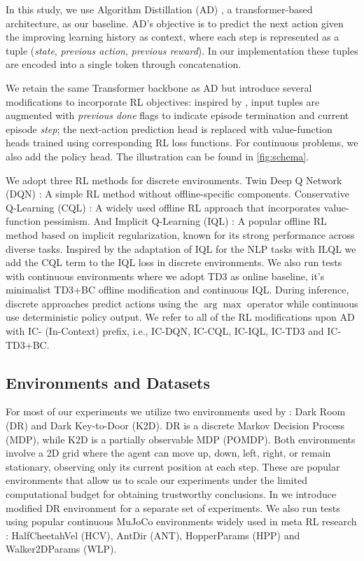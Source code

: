 \documentclass{article} %
\begin{document}
In this study, we use Algorithm Distillation (AD) \citep{laskin2022context}, a transformer-based \citep{vaswani2017attention} architecture, as our baseline. AD’s objective is to predict the next action given the improving learning history as context, where each step is represented as a tuple (\textit{state}, \textit{previous action}, \textit{previous reward}). In our implementation these tuples are encoded into a single token through concatenation. 

We retain the same Transformer backbone as AD but introduce several modifications to incorporate RL objectives: inspired by \citet{grigsby2023amago}, input tuples are augmented with \textit{previous done} flags to indicate episode termination and current episode \textit{step}; the next-action prediction head is replaced with value-function heads trained using corresponding RL loss functions. For continuous problems, we also add the policy head. The illustration can be found in \autoref{fig:schema}.

We adopt three RL methods for discrete environments. Twin Deep Q Network (DQN) \citep{mnih2013playing}: A simple RL method without offline-specific components.
Conservative Q-Learning (CQL) \citep{kumar2020conservative}: A widely used offline RL approach that incorporates value-function pessimism. And Implicit Q-Learning (IQL) \citep{kostrikov2021offline}: A popular offline RL method based on implicit regularization, known for its strong performance across diverse tasks. Inspired by the adaptation of IQL for the NLP tasks with ILQL \citep{snell2022offline} we add the CQL term to the IQL loss in discrete environments. We also run tests with continuous environments where we adopt TD3 \citep{fujimoto2018addressing} as online baseline, it's minimalist TD3+BC \citep{fujimoto2021minimalist} offline modification and continuous IQL.
During inference, discrete approaches predict actions using the $\arg \max$ operator while continuous use deterministic policy output. We refer to all of the RL modifications upon AD with IC- (In-Context) prefix, i.e., IC-DQN, IC-CQL, IC-IQL, IC-TD3 and IC-TD3+BC.

\subsection{Environments and Datasets}
For most of our experiments we utilize two environments used by \citet{laskin2022context}: Dark Room (DR) and Dark Key-to-Door (K2D). DR is a discrete Markov Decision Process (MDP), while K2D is a partially observable MDP (POMDP). Both environments involve a 2D grid where the agent can move up, down, left, right, or remain stationary, observing only its current position at each step. These are popular environments that allow us to scale our experiments under the limited computational budget for obtaining trustworthy conclusions. In  we introduce modified DR environment for a separate set of experiments. We also run tests using popular continuous MuJoCo environments widely used in meta RL research \citep{rakelly2019efficient}: HalfCheetahVel (HCV), AntDir (ANT), HopperParams (HPP) and Walker2DParams (WLP).
\end{document}
